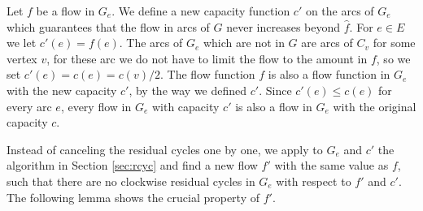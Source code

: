 \documentclass[a4paper,11pt]{article}
\begin{document}
Let $f$ be a flow in $G_e$. We define a new capacity function $c'$ on the
arcs of $G_e$ which guarantees that the flow in arcs of $G$ never increases
beyond $\hat{f}$.
For $e \in E$ we let $c'(e) = f(e)$. The arcs of $G_e$ which are not in $G$
are arcs of $C_v$ for some vertex $v$, for these arc we do not have to limit
the flow to the amount in $f$, so we set $c'(e) = c(e) = c(v)/2$. The flow
function $f$ is also a flow function in $G_e$ with the new capacity $c'$, by
the way we defined $c'$. Since $c'(e) \leq c(e)$ for every arc $e$, every
flow in $G_e$ with capacity $c'$ is also a flow in $G_e$ with the original
capacity $c$.

Instead of canceling the residual cycles one by one,
we apply to $G_e$ and $c'$ the algorithm in Section \ref{sec:rcyc} and find a
new flow $f'$ with the same value as $f$, such that there are no clockwise
residual cycles in $G_e$ with respect to $f'$ and $c'$.
The following lemma shows the crucial property of $f'$.
\end{document}
